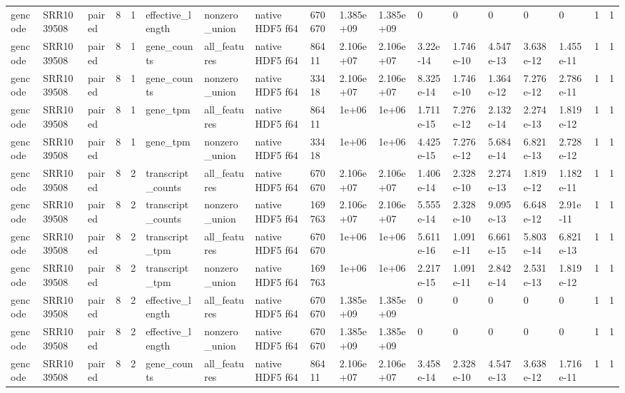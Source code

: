 \begin{tabular}{llllllllllllllllll}
gencode & SRR1039508 & paired & 8 & 1 & effective\_length & nonzero\_union & native HDF5 f64 & 670670 & 1.385e+09 & 1.385e+09 & 0 & 0 & 0 & 0 & 0 & 1 & 1 \\
gencode & SRR1039508 & paired & 8 & 1 & gene\_counts & all\_features & native HDF5 f64 & 86411 & 2.106e+07 & 2.106e+07 & 3.22e-14 & 1.746e-10 & 4.547e-13 & 3.638e-12 & 1.455e-11 & 1 & 1 \\
gencode & SRR1039508 & paired & 8 & 1 & gene\_counts & nonzero\_union & native HDF5 f64 & 33418 & 2.106e+07 & 2.106e+07 & 8.325e-14 & 1.746e-10 & 1.364e-12 & 7.276e-12 & 2.786e-11 & 1 & 1 \\
gencode & SRR1039508 & paired & 8 & 1 & gene\_tpm & all\_features & native HDF5 f64 & 86411 & 1e+06 & 1e+06 & 1.711e-15 & 7.276e-12 & 2.132e-14 & 2.274e-13 & 1.819e-12 & 1 & 1 \\
gencode & SRR1039508 & paired & 8 & 1 & gene\_tpm & nonzero\_union & native HDF5 f64 & 33418 & 1e+06 & 1e+06 & 4.425e-15 & 7.276e-12 & 5.684e-14 & 6.821e-13 & 2.728e-12 & 1 & 1 \\
gencode & SRR1039508 & paired & 8 & 2 & transcript\_counts & all\_features & native HDF5 f64 & 670670 & 2.106e+07 & 2.106e+07 & 1.406e-14 & 2.328e-10 & 2.274e-13 & 1.819e-12 & 1.182e-11 & 1 & 1 \\
gencode & SRR1039508 & paired & 8 & 2 & transcript\_counts & nonzero\_union & native HDF5 f64 & 169763 & 2.106e+07 & 2.106e+07 & 5.555e-14 & 2.328e-10 & 9.095e-13 & 6.648e-12 & 2.91e-11 & 1 & 1 \\
gencode & SRR1039508 & paired & 8 & 2 & transcript\_tpm & all\_features & native HDF5 f64 & 670670 & 1e+06 & 1e+06 & 5.611e-16 & 1.091e-11 & 6.661e-15 & 5.803e-14 & 6.821e-13 & 1 & 1 \\
gencode & SRR1039508 & paired & 8 & 2 & transcript\_tpm & nonzero\_union & native HDF5 f64 & 169763 & 1e+06 & 1e+06 & 2.217e-15 & 1.091e-11 & 2.842e-14 & 2.531e-13 & 1.819e-12 & 1 & 1 \\
gencode & SRR1039508 & paired & 8 & 2 & effective\_length & all\_features & native HDF5 f64 & 670670 & 1.385e+09 & 1.385e+09 & 0 & 0 & 0 & 0 & 0 & 1 & 1 \\
gencode & SRR1039508 & paired & 8 & 2 & effective\_length & nonzero\_union & native HDF5 f64 & 670670 & 1.385e+09 & 1.385e+09 & 0 & 0 & 0 & 0 & 0 & 1 & 1 \\
gencode & SRR1039508 & paired & 8 & 2 & gene\_counts & all\_features & native HDF5 f64 & 86411 & 2.106e+07 & 2.106e+07 & 3.458e-14 & 2.328e-10 & 4.547e-13 & 3.638e-12 & 1.716e-11 & 1 & 1 \\

\end{tabular}
